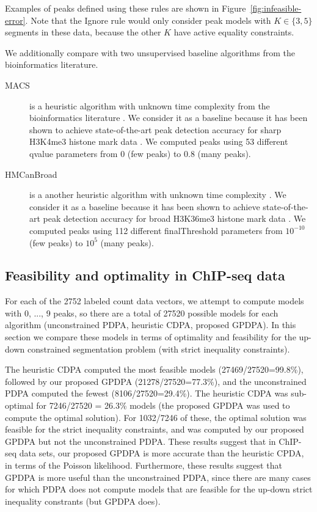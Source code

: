 \documentclass[twoside,11pt]{article}
\begin{document}
Examples of peaks defined using these rules are shown in
Figure~\ref{fig:infeasible-error}. Note that the Ignore rule would
only consider peak models with $K\in\{3,5\}$ segments in these data,
because the other $K$ have active equality constraints.

We additionally compare with two unsupervised baseline algorithms from the
bioinformatics literature. 
\begin{description}
\item[MACS] is a heuristic algorithm with unknown time complexity from
  the bioinformatics literature \citep{MACS}. We consider it as a
  baseline because it has been shown to achieve state-of-the-art peak
  detection accuracy for sharp H3K4me3 histone mark data
  \citep{HOCKING-PeakSeg}. We computed peaks using 53 different qvalue
  parameters from 0 (few peaks) to 0.8 (many peaks).
\item[HMCanBroad] is a another heuristic algorithm with unknown time
  complexity \citep{HMCan}. We consider it as a baseline because it
  has been shown to achieve state-of-the-art peak detection accuracy
  for broad H3K36me3 histone mark data \citep{HOCKING-PeakSeg}. We
  computed peaks using 112 different finalThreshold parameters from
  $10^{-10}$ (few peaks) to $10^5$ (many peaks).
\end{description}

\subsection{Feasibility and optimality in ChIP-seq data}

For each of the 2752 labeled count data vectors, we attempt to compute
models with 0, ..., 9 peaks, so there are a total of 27520 possible
models for each algorithm (unconstrained PDPA, heuristic CDPA,
proposed GPDPA). In this section we compare these models in terms of
optimality and feasibility for the up-down constrained segmentation
problem (with strict inequality constraints).

The heuristic CDPA computed the most feasible models
(27469/27520=99.8\%), followed by our proposed GPDPA
(21278/27520=77.3\%), and the unconstrained PDPA computed the fewest
(8106/27520=29.4\%). The heuristic CDPA was sub-optimal for 7246/27520 = 26.3\%
models (the proposed GPDPA was used to compute the optimal solution). 
For 1032/7246 of these, the optimal solution was feasible for the
strict inequality constraints, and was computed by our proposed GPDPA
but not the unconstrained PDPA. 
These results suggest that in ChIP-seq data
sets, our proposed GPDPA is more accurate than the heuristic CPDA, in terms of the Poisson likelihood. 
Furthermore, these results suggest
that GPDPA is more useful than the unconstrained PDPA, since there are
many cases for which PDPA does not compute models that are feasible
for the up-down strict inequality constrants (but GPDPA does).
\end{document}
